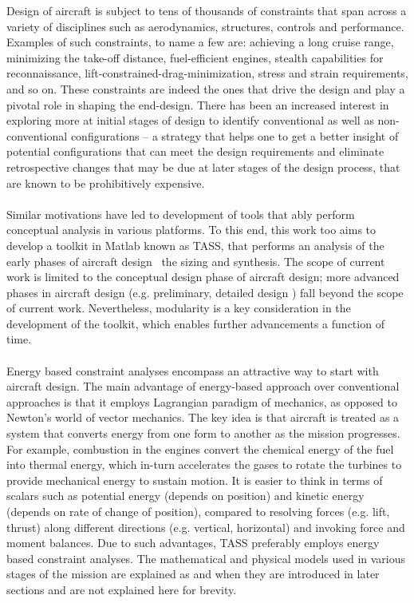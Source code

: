 \documentclass[pdftex,11pt,letter]{article}
\begin{document}
Design of aircraft is subject to tens of thousands of constraints that span across a variety of disciplines such as aerodynamics, structures, controls and performance\cite{NicolaiText,FieldingText,HoweText,RaymerText}. Examples of such constraints, to name a few are: achieving a long cruise range, minimizing the take-off distance, fuel-efficient engines, stealth capabilities for reconnaissance, lift-constrained-drag-minimization, stress and strain requirements, and so on. These constraints are indeed the ones that drive the design and play a pivotal role in shaping the end-design. There has been an increased interest in exploring more at initial stages of design to identify conventional as well as non-conventional configurations -- a strategy that helps one to get a better insight of potential configurations that can meet the design requirements and eliminate retrospective changes that may be due at later stages of the design process, that are known to be prohibitively expensive. 
\\\\
Similar motivations have led to development of tools that ably perform conceptual analysis in various platforms\cite{Raymer2004, Kroo2005}. To this end, this work too aims to develop a toolkit in Matlab\cite{MATLAB} known as TASS, that performs an analysis of the early phases of aircraft design \ie~the sizing and synthesis. The scope of current work is limited to the conceptual design phase of aircraft design; more advanced phases in aircraft design (e.g. preliminary, detailed design \etc) fall beyond the scope of current work. Nevertheless, modularity is a key consideration in the development of the toolkit, which enables further advancements a function of time.
\\\\
Energy based constraint analyses encompass an attractive way to start with aircraft design. The main advantage of energy-based approach over conventional approaches is that it employs Lagrangian paradigm of mechanics, as opposed to Newton's world of vector mechanics. The key idea is that aircraft is treated as a system that converts energy from one form to another as the mission progresses. For example, combustion in the engines convert the chemical energy of the fuel into thermal energy, which in-turn accelerates the gases to rotate the turbines to provide mechanical energy to sustain motion. It is easier to think in terms of scalars such as potential energy (depends on position) and  kinetic energy (depends on rate of change of position), compared to resolving forces (e.g. lift, thrust)  along different directions (e.g. vertical, horizontal) and invoking force and moment balances. Due to such advantages, \textsc{TASS} preferably employs energy based constraint analyses. The mathematical and physical models used in various stages of the mission are explained as and when they are introduced in later sections and are not explained here for brevity.
\end{document}
